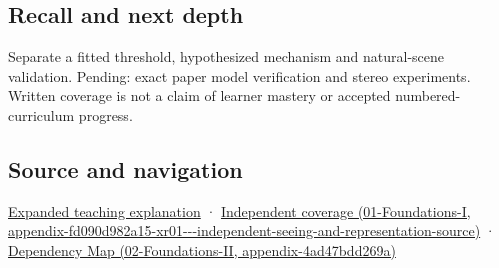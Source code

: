 \subsection{Recall and next depth}\label{appendix-8dc848f14052-recall-and-next-depth}

Separate a fitted threshold, hypothesized mechanism and natural-scene validation. Pending: exact paper model verification and stereo experiments. Written coverage is not a claim of learner mastery or accepted numbered-curriculum progress.

\subsection{Source and navigation}\label{appendix-8dc848f14052-source-and-navigation}

\hyperref[04-visual-computing-ii-ch042-binocular-depth-changes-the-optimization-question]{Expanded teaching explanation} · \href{../01-Foundations-I/main.pdf\#nameddest=appendix-fd090d982a15-xr01---independent-seeing-and-representation-source}{Independent coverage (01-Foundations-I, appendix-fd090d982a15-xr01-\/-\/-independent-seeing-and-representation-source)} · \href{../02-Foundations-II/main.pdf\#nameddest=appendix-4ad47bdd269a}{Dependency Map (02-Foundations-II, appendix-4ad47bdd269a)}
